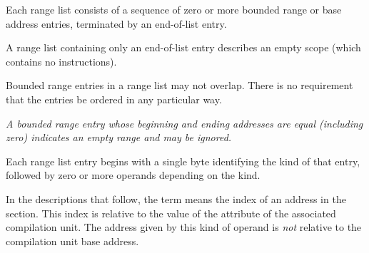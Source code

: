 Each range list consists of a sequence of zero or more bounded
range or base address entries, terminated by an end-of-list entry.

A range list containing only an end-of-list entry describes an
empty scope (which contains no instructions).
   
Bounded range entries in a range list may not overlap. There is
no requirement that the entries be ordered in any particular way.

\textit{
\bb
A bounded range entry whose beginning and ending addresses 
\db
are equal (including zero) indicates an empty range and may be
\eb
ignored.}
   
Each range list entry begins with a single byte identifying the kind
of that entry, followed by zero or more operands depending on the
kind.

In the descriptions that follow, the term 
means the index of an address in the \dotdebugaddr{} section. This
index is relative to the value of the \DWATaddrbase{} attribute
of the associated compilation unit. The address given by this kind
of operand is \emph{not} relative to the compilation unit base 
address.
    

